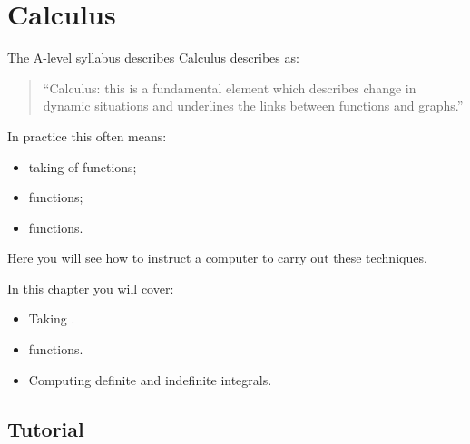 \chapter{Calculus}
\label{\detokenize{tools-for-mathematics/03-calculus/introduction/main:calculus}}\label{\detokenize{tools-for-mathematics/03-calculus/introduction/main::doc}}

The A-level syllabus describes Calculus 
describes
as:

\begin{quote}
``Calculus: this is a fundamental element which describes change in dynamic
situations and underlines the links between functions and graphs.''
\end{quote}


In practice this often means:
\begin{itemize}
\item 

taking  of functions;

\item 

 functions;

\item 

 functions.

\end{itemize}


Here you will see how to instruct a computer to carry out these techniques.



\begin{note}
In this chapter you will cover:
\begin{itemize}
\item 

Taking .

\item 

 functions.

\item 

Computing definite and indefinite integrals.

\end{itemize}
\end{note}





\section{Tutorial}
\label{\detokenize{tools-for-mathematics/03-calculus/tutorial/main:tutorial}}\label{\detokenize{tools-for-mathematics/03-calculus/tutorial/main::doc}}

